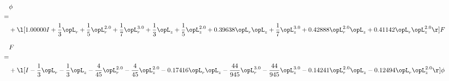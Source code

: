 \begin{alignat}{2} 
\label{eq:scalarFlux_1} 
& \phi \nonumber \\ 
 = \\ 
& + \l[  1.00000 I + \frac{1}{3} \opL_r + \frac{1}{5} \opL_r^{2.0} + \frac{1}{7} \opL_r^{3.0} + \frac{1}{3} \opL_z + \frac{1}{5} \opL_z^{2.0} +  0.39638 \opL_r \opL_z + \frac{1}{7} \opL_z^{3.0} +  0.42888 \opL_r^{2.0} \opL_z +  0.41142 \opL_r \opL_z^{2.0}  \r] F \nonumber \\ 
\end{alignat} 


\begin{alignat}{2} 
\label{eq:transport3D_0} 
& F \nonumber \\ 
 = \\ 
& + \l[ I - \frac{1}{3} \opL_r - \frac{1}{3} \opL_z - \frac{4}{45} \opL_r^{2.0} - \frac{4}{45} \opL_z^{2.0}   -0.17416 \opL_r \opL_z - \frac{44}{945} \opL_r^{3.0} - \frac{44}{945} \opL_z^{3.0}   -0.14241 \opL_r^{2.0} \opL_z   -0.12494 \opL_r \opL_z^{2.0}  \r] \phi \nonumber \\ 
\end{alignat} 


